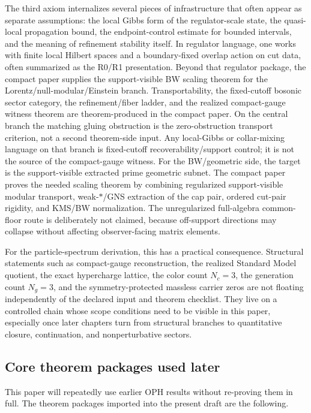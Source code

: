 \documentclass[11pt]{article}
\begin{document}
The third axiom internalizes several pieces of infrastructure that often appear as separate
assumptions: the local Gibbs form of the regulator-scale state, the
quasi-local propagation bound, the endpoint-control estimate for bounded intervals, and the
meaning of refinement stability itself. In regulator language, one works with finite local
Hilbert spaces and a boundary-fixed overlap action on cut data, often summarized as the R0/R1
presentation. Beyond that regulator package, the compact paper supplies the support-visible BW
scaling theorem for the Lorentz/null-modular/Einstein branch. Transportability, the fixed-cutoff bosonic sector category, the refinement/fiber
ladder, and the realized compact-gauge witness theorem are theorem-produced in the compact paper. On the central branch the matching gluing
obstruction is the zero-obstruction transport criterion, not a second theorem-side input. Any
local-Gibbs or collar-mixing language on that branch is fixed-cutoff recoverability/support
control; it is not the source of the compact-gauge witness.
For the BW/geometric side, the target is the support-visible extracted prime geometric subnet.
The compact paper proves the needed scaling theorem by combining regularized support-visible
modular transport, weak-\(*\)/GNS extraction of the cap pair, ordered cut-pair rigidity, and
KMS/BW normalization. The unregularized full-algebra common-floor route is deliberately not
claimed, because off-support directions may collapse without affecting observer-facing matrix
elements.

For the particle-spectrum derivation, this has a practical consequence. Structural statements such
as compact-gauge reconstruction, the realized Standard Model quotient, the exact hypercharge
lattice, the color count \(N_c=3\), the generation count \(N_g=3\), and the symmetry-protected
massless carrier zeros are not floating independently of the declared input and theorem checklist. They live on a
controlled chain whose scope conditions need to be visible in this paper,
especially once later chapters turn from structural branches to quantitative closure, continuation, and
nonperturbative sectors.

\subsection{Core theorem packages used later}

This paper will repeatedly use earlier OPH results without re-proving them in full. The
theorem packages imported into the present draft are the following.
\end{document}
